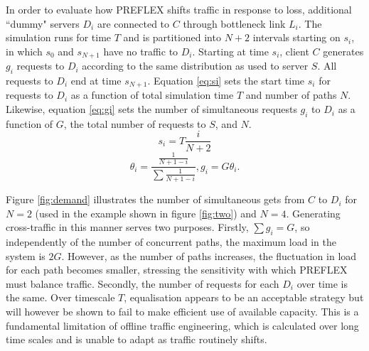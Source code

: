 In order to evaluate how \ac{PREFLEX} shifts traffic in response to loss, additional ``dummy" servers $D_i$ are connected to $C$ through bottleneck link $L_i$.
The simulation runs for time $T$ and is partitioned into $N+2$ intervals starting on $s_i$, in which $s_0$ and $s_{N+1}$ have no traffic to $D_i$. 
Starting at time $s_i$, client $C$ generates $g_i$ requests to $D_i$ according to the same distribution as used to server $S$. 
All requests to $D_i$ end at time $s_{N+1}$. 
Equation \eqref{eq:si} sets the start time $s_i$ for requests to $D_i$ as a function of total simulation time $T$ and number of paths $N$. 
Likewise, equation \eqref{eq:gi} sets the number of simultaneous requests $g_i$ to $D_i$ as a function of $G$, the total number of requests to $S$, and $N$.
\begin{equation}
s_i = T\frac{i}{N+2}
\label{eq:si}
\end{equation}
\begin{equation}
\theta_i = \frac{\frac{1}{N+1-i}}{\sum{\frac{1}{N+1-i}}},  g_i = G\theta_i.
\label{eq:gi}
\end{equation}

Figure \ref{fig:demand} illustrates the number of simultaneous gets from $C$ to $D_i$ for $N=2$ (used in the example shown in figure \ref{fig:two}) and $N=4$.
Generating cross-traffic in this manner serves two purposes. 
Firstly, $\sum{g_i}=G$, so independently of the number of concurrent paths, the maximum load in the system is $2G$. 
However, as the number of paths increases, the fluctuation in load for each path becomes smaller, stressing the sensitivity with which \ac{PREFLEX} must balance traffic. 
Secondly, the number of requests for each $D_i$ over time is the same. 
Over timescale $T$, equalisation appears to be an acceptable strategy but will however be shown to fail to make efficient use of available capacity. 
This is a fundamental limitation of offline traffic engineering, which is calculated over long time scales and is unable to adapt as traffic routinely shifts.

